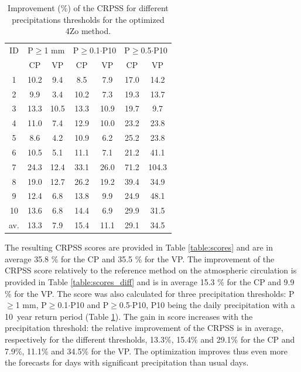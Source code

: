 \documentclass[5p]{elsarticle}
\begin{document}
\begin{table}[htb]
	\caption{Improvement (\%) of the CRPSS for different precipitations thresholds for the optimized 4Zo method.}
	\footnotesize
	\begin{center}
		\begin{tabular}{ccccccc}
			\hline 
			ID & \multicolumn{2}{c}{P\(\geq\)1 mm} & \multicolumn{2}{c}{P\(\geq\)0.1\(\cdot\)P10} & \multicolumn{2}{c}{P\(\geq\)0.5\(\cdot\)P10} \\ 
			& CP & VP & CP & VP & CP & VP \\ 
			\hline 
			1 & 10.2 & 9.4 & 8.5 & 7.9 & 17.0 & 14.2 \\ 
			2 & 9.9 & 3.4 & 10.2 & 7.3 & 19.3 & 13.7 \\ 
			3 & 13.3 & 10.5 & 13.3 & 10.9 & 19.7 & 9.7 \\ 
			4 & 11.0 & 7.4 & 12.9 & 10.0 & 23.2 & 23.8 \\ 
			5 & 8.6 & 4.2 & 10.9 & 6.2 & 25.2 & 23.8 \\ 
			6 & 10.5 & 5.1 & 11.1 & 7.1 & 21.2 & 41.1 \\ 
			7 & 24.3 & 12.4 & 33.1 & 26.0 & 71.2 & 104.3 \\ 
			8 & 19.0 & 12.7 & 26.2 & 19.2 & 39.4 & 34.9 \\ 
			9 & 12.4 & 6.8 & 13.8 & 9.9 & 24.9 & 48.1 \\ 
			10 & 13.6 & 6.8 & 14.4 & 6.9 & 29.9 & 31.5 \\ 
			\hline 
			av. & 13.3 & 7.9 & 15.4 & 11.1 & 29.1 & 34.5 \\ 
			\hline 
		\end{tabular} 
	\end{center}
	\label{table:scores_thresholds_4Zo}
\end{table}

The resulting CRPSS scores are provided in Table \ref{table:scores} and are in average 35.8 \% for the CP and 35.5 \% for the VP. The improvement of the CRPSS score relatively to the reference method on the atmospheric circulation is provided in Table \ref{table:scores_diff} and is in average 15.3 \% for the CP and 9.9 \% for the VP. The score was also calculated for three precipitation thresholds: P\(\geq\)1 mm, P\(\geq\)0.1\(\cdot\)P10 and P\(\geq\)0.5\(\cdot\)P10, P10 being the daily precipitation with a 10~year return period (Table \ref{table:scores_thresholds_4Zo}). The gain in score increases with the precipitation threshold: the relative improvement of the CRPSS is in average, respectively for the different thresholds, 13.3\%, 15.4\% and 29.1\% for the CP and 7.9\%, 11.1\% and 34.5\% for the VP. The optimization improves thus even more the forecasts for days with significant precipitation than usual days.
\end{document}
